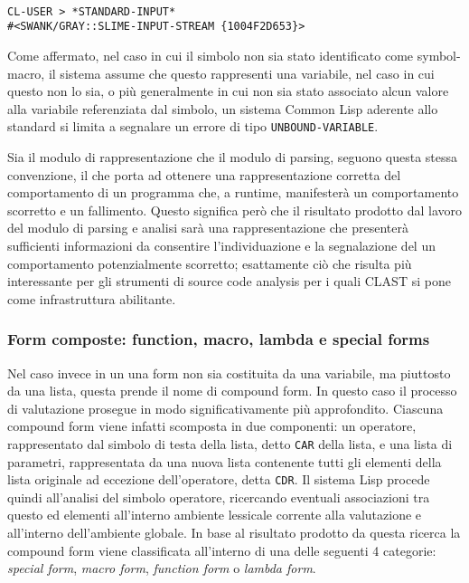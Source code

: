 \begin{lstlisting}[caption=Esempio di form di tipo symbol]

CL-USER > *STANDARD-INPUT*
#<SWANK/GRAY::SLIME-INPUT-STREAM {1004F2D653}>

\end{lstlisting}

Come affermato, nel caso in cui il simbolo non sia stato identificato come
symbol-macro, il sistema assume che questo rappresenti una variabile, nel caso
in cui questo non lo sia, o più generalmente in cui non sia stato associato
alcun valore alla variabile referenziata dal simbolo, un sistema Common Lisp
aderente allo standard si limita a segnalare un errore di tipo \texttt
{UNBOUND-VARIABLE}.

Sia il modulo di rappresentazione che il modulo di parsing, seguono questa
stessa convenzione, il che porta ad ottenere una rappresentazione corretta del
comportamento di un programma che, a runtime, manifesterà un comportamento
scorretto e un fallimento. Questo significa però che il risultato prodotto dal
lavoro del modulo di parsing e analisi sarà una rappresentazione che presenterà
sufficienti informazioni da consentire l’individuazione e la segnalazione del un
comportamento potenzialmente scorretto; esattamente ciò che risulta più
interessante per gli strumenti di source code analysis per i quali CLAST si pone
come infrastruttura abilitante.

\subsubsection{Form composte: function, macro, lambda e special forms}

Nel caso invece in un una form non sia costituita da una variabile, ma piuttosto
da una lista, questa prende il nome di compound form. In questo caso il processo
di valutazione prosegue in modo significativamente più approfondito. Ciascuna
compound form viene infatti scomposta in due componenti: un operatore,
rappresentato dal simbolo di testa della lista, detto \texttt{CAR} della lista,
e una lista di parametri, rappresentata da una nuova lista contenente tutti gli
elementi della lista originale ad eccezione dell’operatore, detta \texttt{CDR}.
Il sistema Lisp procede quindi all'analisi del simbolo operatore, ricercando
eventuali associazioni tra questo ed elementi all’interno ambiente lessicale
corrente alla valutazione e all'interno dell'ambiente globale. In base al
risultato prodotto da questa ricerca la compound form viene classificata
all’interno di una delle seguenti 4 categorie: \textit{special form},
\textit{macro form}, \textit{function form} o \textit{lambda form}.

